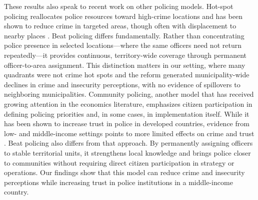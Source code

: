These results also speak to recent work on other policing models. Hot-spot policing reallocates police resources toward high-crime locations and has been shown to reduce crime in targeted areas, though often with displacement to nearby places \citep{DiTella, Blattman_Tobon_JEEA, Draca_2011, Weisburd_restat}. Beat policing differs fundamentally. Rather than concentrating police presence in selected locations---where the same officers need not return repeatedly---it provides continuous, territory-wide coverage through permanent officer-to-area assignment. This distinction matters in our setting, where many quadrants were not crime hot spots and the reform generated municipality-wide declines in crime and insecurity perceptions, with no evidence of spillovers to neighboring municipalities. Community policing, another model that has received growing attention in the economics literature, emphasizes citizen participation in defining policing priorities and, in some cases, in implementation itself. While it has been shown to increase trust in police in developed countries, evidence from low- and middle-income settings points to more limited effects on crime and trust \citep{blair2021, Tobon}. Beat policing also differs from that approach. By permanently assigning officers to stable territorial units, it strengthens local knowledge and brings police closer to communities without requiring direct citizen participation in strategy or operations. Our findings show that this model can reduce crime and insecurity perceptions while increasing trust in police institutions in a middle-income country.

